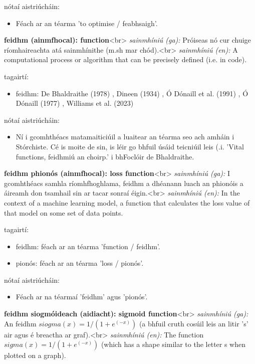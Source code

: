 \documentclass{article}
\begin{document}
nótaí aistriúcháin:
\begin{itemize}
	\item Féach ar an téarma 'to optimise / feabhsaigh'.
\end{itemize}


\textbf{feidhm (ainmfhocal): function}<br>
\textit{sainmhíniú (ga):} Próiseas nó cur chuige ríomhaireachta atá sainmhínithe (m.sh mar chód).<br>
\textit{sainmhíniú (en):} A computational process or algorithm that can be precisely defined (i.e. in code).

tagairtí:
\begin{itemize}
	\item feidhm: De Bhaldraithe (1978) \cite{de-bhaldraithe}, Dineen (1934) \cite{dineen}, Ó Dónaill et al. (1991) \cite{focloir-beag}, Ó Dónaill (1977) \cite{odonaill}, Williams et al. (2023) \cite{storchiste}
\end{itemize}

nótaí aistriúcháin:
\begin{itemize}
	\item Ní i gcomhthéacs matamaiticiúil a luaitear an téarma seo ach amháin i Stórchiste. Cé is moite de sin, is léir go bhfuil úsáid teicniúil leis (.i. 'Vital functions, feidhmiú an choirp.' i bhFoclóir de Bhaldraithe.
\end{itemize}


\textbf{feidhm phionós (ainmfhocal): loss function}<br>
\textit{sainmhíniú (ga):} I gcomhthéacs samhla ríomhfhoghlama, feidhm a dhéanann luach an phionóis a áireamh don tsamhail sin ar tacar sonraí éigin.<br>
\textit{sainmhíniú (en):} In the context of a machine learning model, a function that calculates the loss value of that model on some set of data points.

tagairtí:
\begin{itemize}
	\item feidhm: féach ar an téarma 'function / feidhm'.
	\item pionós: féach ar an téarma 'loss / pionós'.
\end{itemize}

nótaí aistriúcháin:
\begin{itemize}
	\item Féach ar na téarmaí 'feidhm' agus 'pionós'.
\end{itemize}


\textbf{feidhm siogmóideach (aidiacht): sigmoid function}<br>
\textit{sainmhíniú (ga):} An feidhm $siogma(x) = 1 / (1 + e^(-x))$ (a bhfuil cruth cosúil leis an litir 's' air agus é breactha ar graf).<br>
\textit{sainmhíniú (en):} The function $sigma(x) = 1 / (1 + e^(-x))$ (which has a shape similar to the letter s when plotted on a graph).
\end{document}
